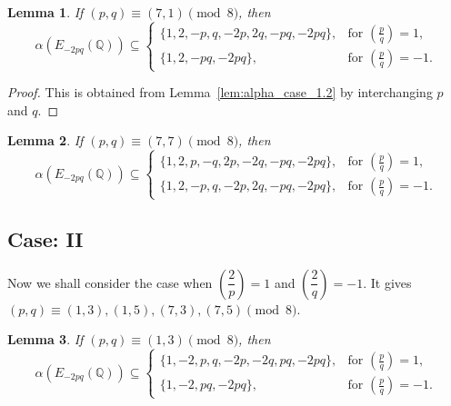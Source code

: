 \documentclass[12pt]{amsart}
\newcommand{\bbQ}{\mathbb{Q}}
\newcommand{\cT}{\mathcal{T}}
\newcommand{\legendre}[2]{\genfrac{(}{)}{}{}{#1}{#2}}
\numberwithin{equation}{section}
\newtheorem{lem}{Lemma}[section]
\theoremstyle{definition}
\begin{document}
\begin{lem}
\label{lem:alpha_case_1.3}
If $(p,q)\equiv (7,1)\pmod 8$, then
\[
\alpha\left(E_{-2pq}(\bbQ)\right)\subseteq
\begin{cases}
\{1,2,-p,q,-2p,2q,-pq,-2pq\},
& \text{for } \legendre{p}{q}=1,\\
\{1,2,-pq,-2pq\},
& \text{for } \legendre{p}{q}=-1.
\end{cases}
\]
\end{lem}

\begin{proof}
This is obtained from Lemma~\ref{lem:alpha_case_1.2} by interchanging $p$ and $q$.
\end{proof}

\begin{lem}
\label{lem:alpha_case_1.4}
If $(p,q)\equiv (7,7)\pmod 8$, then
\[
\alpha\left(E_{-2pq}(\bbQ)\right)\subseteq
\begin{cases}
\{1,2,p,-q,2p,-2q,-pq,-2pq\},
& \text{for } \legendre{p}{q}=1,\\
\{1,2,-p,q,-2p,2q,-pq,-2pq\},
& \text{for } \legendre{p}{q}=-1.
\end{cases}
\]
\end{lem}






\subsection*{Case: II}Now we shall consider the case when $\left(\dfrac{2}{p}\right)=1$ and
$\left(\dfrac{2}{q}\right)=-1$. It gives $(p,q)\equiv (1,3),(1,5),(7,3),(7,5)\pmod 8$.

\begin{lem}
\label{lem:alpha_case_2.1}
If $(p,q)\equiv (1,3)\pmod 8$, then
\[
\alpha\left(E_{-2pq}(\bbQ)\right)\subseteq
\begin{cases}
\{1,-2,p,q,-2p,-2q,pq,-2pq\},
& \text{for } \legendre{p}{q}=1,\\
\{1,-2,pq,-2pq\},
& \text{for } \legendre{p}{q}=-1.
\end{cases}
\]
\end{lem}
\end{document}

